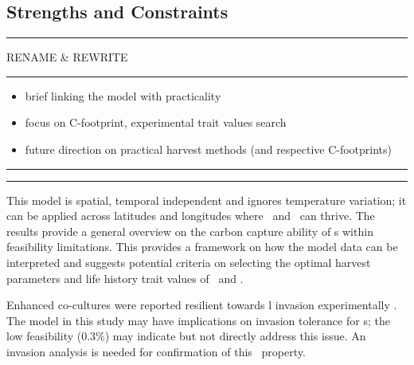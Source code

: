 \documentclass[env.tex]{subfiles}
\begin{document}
\subsection{Strengths and Constraints}

\begin{center}\begin{minipage}[H]{.97\linewidth}
\noindent\rule{3.5cm}{1pt}
RENAME \& REWRITE
\noindent\rule{3.5cm}{1pt}
\begin{itemize}
    \item brief linking the model with practicality
    \item focus on C-footprint, experimental trait values search
    \item future direction on practical harvest methods (and respective C-footprints)
\end{itemize}\noindent\rule{10cm}{1pt}
\end{minipage}\end{center}

\noindent\rule{10cm}{4pt}

This model is spatial, temporal independent and ignores temperature variation; it can be applied across latitudes and longitudes where \phy\ and \bac\ can thrive.  The results provide a general overview on the carbon capture ability of \pbs s within feasibility limitations.  This provides a framework on how the model data can be interpreted and suggests potential criteria on selecting the optimal harvest parameters and life history trait values of \phy\ and \bac.

Enhanced co-cultures were reported resilient towards \bac l invasion experimentally \autocite{fuentes2016impact,seyedsayamdost2011roseobacticides}.  The model in this study may have implications on invasion tolerance for \pbs s; the low feasibility (0.3\%) may indicate but not directly address this issue.  An invasion analysis is needed for confirmation of this \pbs\ property.
\end{document}
